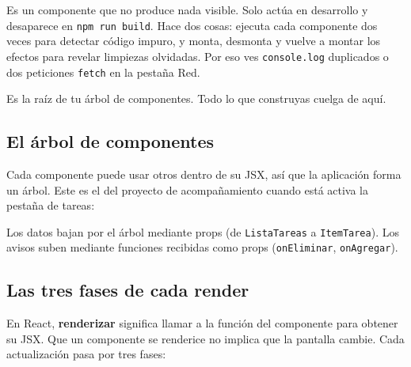 \documentclass[11pt,a4paper]{article}
\newcommand{\cmd}[1]{\texttt{\color{reactdark}#1}}
\begin{document}
\begin{description}[leftmargin=0pt, style=nextline, itemsep=0.5em]
\item[Línea 10: \texttt{<StrictMode>}.]
Es un componente que no produce nada visible. Solo actúa en desarrollo y desaparece en \cmd{npm run build}. Hace dos cosas: ejecuta cada componente dos veces para detectar código impuro, y monta, desmonta y vuelve a montar los efectos para revelar limpiezas olvidadas. Por eso ves \cmd{console.log} duplicados o dos peticiones \cmd{fetch} en la pestaña Red.

\item[Línea 11: \texttt{<App />}.]
Es la raíz de tu árbol de componentes. Todo lo que construyas cuelga de aquí.
\end{description}

\subsection{El árbol de componentes}

Cada componente puede usar otros dentro de su JSX, así que la aplicación forma un árbol. Este es el del proyecto de acompañamiento cuando está activa la pestaña de tareas:

\begin{center}
\end{center}

Los datos bajan por el árbol mediante props (de \cmd{ListaTareas} a \cmd{ItemTarea}). Los avisos suben mediante funciones recibidas como props (\cmd{onEliminar}, \cmd{onAgregar}).

\subsection{Las tres fases de cada render}

En React, \textbf{renderizar} significa llamar a la función del componente para obtener su JSX. Que un componente se renderice no implica que la pantalla cambie. Cada actualización pasa por tres fases:
\end{document}
